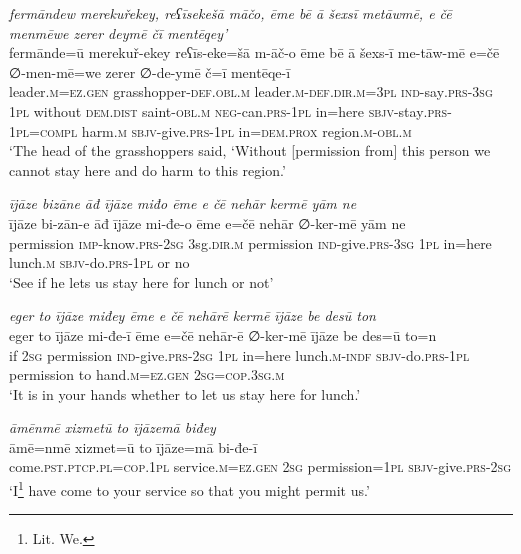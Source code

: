 \ea \label{PM.5}
\textit{fermāndew merekuřekey, reʕīsekešā māčo, ēme bē ā šexsī metāwmē, e čē menmēwe zerer deymē čī mentēqey’} \\ 
\gll fermānde=ū merekuř-ekey reʕīs-eke=šā m-āč-o ēme bē ā šexs-ī me-tāw-mē e=čē ∅-men-mē=we zerer ∅-de-ymē č=ī mentēqe-ī \\ 
 leader\textsc{.m}\textsc{\textsc{=ez.gen}} grasshopper\textsc{-def}\textsc{.obl}\textsc{.m} leader\textsc{.m}\textsc{-def}\textsc{.dir}\textsc{.m}\textsc{=3pl} \textsc{ind-}say\textsc{.prs}\textsc{-3sg} \textsc{1pl} without \textsc{dem.dist} saint\textsc{-obl}\textsc{.m} \textsc{neg-}can\textsc{.prs}\textsc{-1pl} in=here \textsc{sbjv-}stay\textsc{.prs}\textsc{-1pl}\textsc{=compl} harm\textsc{.m} \textsc{sbjv-}give\textsc{.prs}-\textsc{1pl} in=\textsc{dem.prox} region\textsc{.m}\textsc{-obl}\textsc{.m} \\ 
\glt `The head of the grasshoppers said, ‘Without [permission from] this person we cannot stay here and do harm to this region.'
\z 
 
\ea \label{PM.9}
\textit{ījāze bizāne āđ ījāze miđo ēme e čē nehār kermē yām ne} \\ 
\gll ījāze bi-zān-e āđ ījāze mi-đe-o ēme e=čē nehār ∅-ker-mē yām ne \\ 
 permission \textsc{imp-}know\textsc{.prs}-\textsc{2sg} 3sg\textsc{.dir}\textsc{.m} permission \textsc{ind-}give\textsc{.prs}\textsc{-3sg} \textsc{1pl} in=here lunch\textsc{.m} \textsc{sbjv-}do\textsc{.prs}\textsc{-1pl} or no \\ 
\glt `See if he lets us stay here for lunch or not'
\z 
 
\ea \label{PM.14}
\textit{eger to ījāze miđey ēme e čē nehārē kermē ījāze be desū ton} \\ 
\gll eger to ījāze mi-đe-ī ēme e=čē nehār-ē ∅-ker-mē ījāze be des=ū to=n \\ 
 if \textsc{2sg} permission \textsc{ind-}give\textsc{.prs}-\textsc{2sg} \textsc{1pl} in=here lunch\textsc{.m}\textsc{-indf} \textsc{sbjv-}do\textsc{.prs}\textsc{-1pl} permission to hand\textsc{.m}\textsc{\textsc{=ez.gen}} \textsc{2sg}\textsc{=cop}\textsc{.3sg}\textsc{.m} \\ 
\glt `It is in your hands whether to let us stay here for lunch.'
\z 
 
\ea \label{PM.15}
\textit{āmēnmē xizmetū to ījāzemā biđey} \\ 
\gll āmē=nmē xizmet=ū to ījāze=mā bi-đe-ī \\ 
 come\textsc{.pst}\textsc{.ptcp}\textsc{.pl}\textsc{=cop}\textsc{.1pl} service\textsc{.m}\textsc{\textsc{=ez.gen}} \textsc{2sg} permission\textsc{=1pl} \textsc{sbjv-}give\textsc{.prs}-\textsc{2sg} \\ 
\glt `I\footnote{Lit. We.} have come to your service so that you might permit us.'
\z 
 
